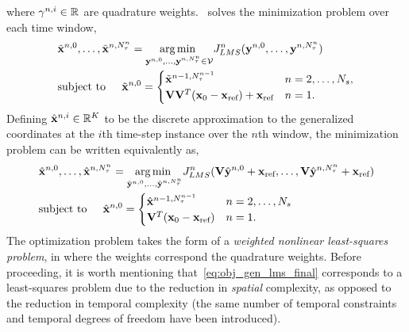 where $\gamma^{n,i} \in \mathbb{R}^{}$ are quadrature weights. \methodAcronym\ solves the minimization problem over each time window, 
\begin{align*}
&\tilde{\mathbf{x}}^{n,0},\ldots,\tilde{\mathbf{x}}^{n,N_{\tau}^{n}} = \underset{\mathbf{y}^{n,0},\ldots,\mathbf{y}^{n,N_{\tau}^{n}} \in \mathcal{V }}{\text{arg\,min } }
J_{LMS}^{n} (\mathbf{y}^{n,0},\ldots,\mathbf{y}^{n,N_{\tau}^{n}}) \\
& \text{subject to} \hspace{0.2 in}  \tilde{\mathbf{x}}^{n,0} =
\begin{cases} \tilde{\mathbf{x}}^{n-1,N_{\tau}^{n-1}} & n = 2,\ldots,N_s,\\
\mathbf {V} \mathbf {V}^T ({{\mathbf{x}}_0} - \mathbf{x}_\text{ref}) + \mathbf{x}_\text{ref} & n=1. \end{cases} \end{align*}
Defining $\hat{\mathbf{x}}^{n,i} \in \mathbb{R}^{K}$ to be the discrete approximation to the generalized coordinates at the $i$th time-step instance over the $n$th window, 
the minimization problem can be written equivalently as,
\begin{equation}\label{eq:obj_gen_lms_final}
\begin{split}
& \hat{\mathbf{x}}^{n,0},\ldots,\hat{\mathbf{x}}^{n,N_{\tau}^{n}}  = \underset{\hat{\mathbf{y}}^{n,0},\ldots,\hat{\mathbf{y}}^{n,N_{\tau}^{n}}}{\text{arg\,min } }
J_{LMS}^{n} (\mathbf {V} \hat{\mathbf{y}}^{n,0} + \mathbf{x}_\text{ref},\ldots,\mathbf {V} \hat{\mathbf{y}}^{n,N_{\tau}^{n}} + \mathbf{x}_\text{ref}) \\ 
& \text{subject to} \hspace{0.2 in}
\hat{\mathbf{x}}^{n,0} =
\begin{cases} \hat{\mathbf{x}}^{n-1, N_{\tau}^{n-1}} & n = 2,\ldots,N_s \\
\mathbf {V}^T({{\mathbf{x}}_0} - \mathbf{x}_\text{ref})& n=1. \end{cases} 
\end{split}
\end{equation}
The optimization problem takes the form of a \textit{weighted nonlinear least-squares problem}, 
in where the weights correspond the quadrature weights.  
Before proceeding, it is worth mentioning that~\eqref{eq:obj_gen_lms_final} corresponds to a least-squares problem due
to the reduction in \textit{spatial} complexity, as opposed to the reduction
in temporal complexity (the same  number of temporal constraints and temporal 
degrees of freedom have been introduced).
 
